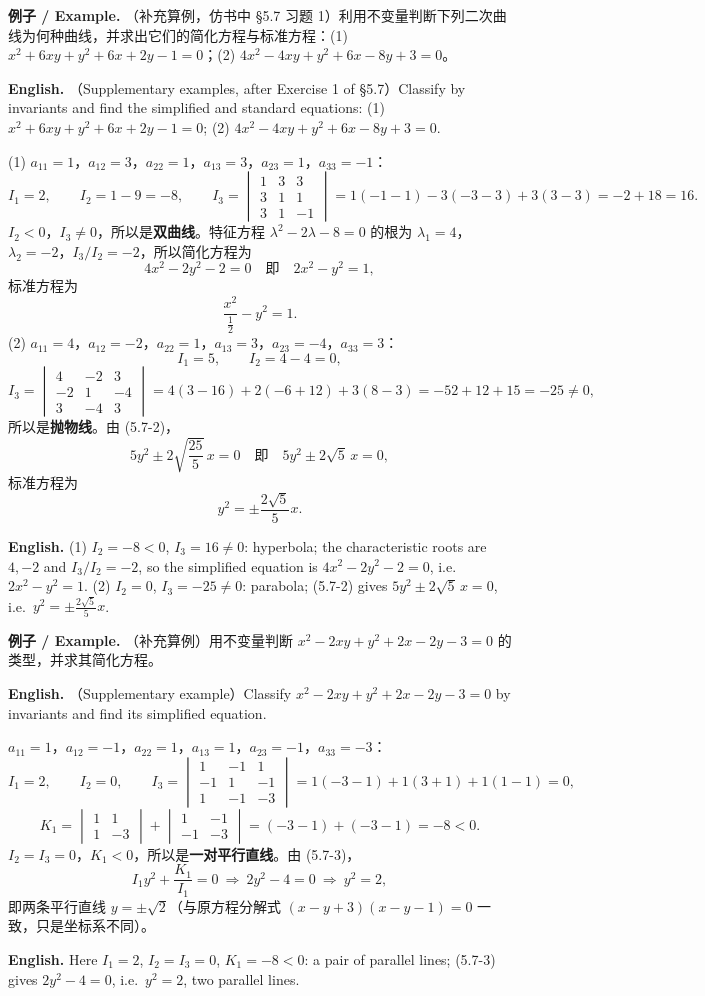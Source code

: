 \documentclass[UTF8,11pt,a4paper]{ctexart}
\newcommand{\EN}[1]{\par\noindent \textbf{English.} #1\par}
\newcommand{\EX}[2]{\par\noindent \textbf{例子 / Example.} #1\par\EN{#2}}
\theoremstyle{definition}
\begin{document}
\EX{（补充算例，仿书中 §5.7 习题 1）利用不变量判断下列二次曲线为何种曲线，并求出它们的简化方程与标准方程：(1) $x^2+6xy+y^2+6x+2y-1=0$；(2) $4x^2-4xy+y^2+6x-8y+3=0$。}{（Supplementary examples, after Exercise 1 of §5.7）Classify by invariants and find the simplified and standard equations: (1) $x^2+6xy+y^2+6x+2y-1=0$; (2) $4x^2-4xy+y^2+6x-8y+3=0$.}
(1) $a_{11}=1$，$a_{12}=3$，$a_{22}=1$，$a_{13}=3$，$a_{23}=1$，$a_{33}=-1$：
\[
I_1=2,\qquad I_2=1-9=-8,\qquad
I_3=\begin{vmatrix}1&3&3\\ 3&1&1\\ 3&1&-1\end{vmatrix}=1(-1-1)-3(-3-3)+3(3-3)=-2+18=16.
\]
$I_2<0$，$I_3\ne0$，所以是\textbf{双曲线}。特征方程 $\lambda^2-2\lambda-8=0$ 的根为 $\lambda_1=4$，$\lambda_2=-2$，$I_3/I_2=-2$，所以简化方程为
\[
4x^2-2y^2-2=0\quad\text{即}\quad 2x^2-y^2=1,
\]
标准方程为
\[
\frac{x^2}{\frac12}-y^2=1.
\]
(2) $a_{11}=4$，$a_{12}=-2$，$a_{22}=1$，$a_{13}=3$，$a_{23}=-4$，$a_{33}=3$：
\[
I_1=5,\qquad I_2=4-4=0,
\]
\[
I_3=\begin{vmatrix}4&-2&3\\ -2&1&-4\\ 3&-4&3\end{vmatrix}=4(3-16)+2(-6+12)+3(8-3)=-52+12+15=-25\ne0,
\]
所以是\textbf{抛物线}。由 (5.7-2)，
\[
5y^2\pm2\sqrt{\frac{25}{5}}\,x=0\quad\text{即}\quad 5y^2\pm2\sqrt5\,x=0,
\]
标准方程为
\[
y^2=\pm\frac{2\sqrt5}{5}x.
\]
\EN{(1) $I_2=-8<0$, $I_3=16\ne0$: hyperbola; the characteristic roots are $4,-2$ and $I_3/I_2=-2$, so the simplified equation is $4x^2-2y^2-2=0$, i.e.\ $2x^2-y^2=1$. (2) $I_2=0$, $I_3=-25\ne0$: parabola; (5.7-2) gives $5y^2\pm2\sqrt5\,x=0$, i.e.\ $y^2=\pm\frac{2\sqrt5}{5}x$.}

\EX{（补充算例）用不变量判断 $x^2-2xy+y^2+2x-2y-3=0$ 的类型，并求其简化方程。}{（Supplementary example）Classify $x^2-2xy+y^2+2x-2y-3=0$ by invariants and find its simplified equation.}
$a_{11}=1$，$a_{12}=-1$，$a_{22}=1$，$a_{13}=1$，$a_{23}=-1$，$a_{33}=-3$：
\[
I_1=2,\qquad I_2=0,\qquad
I_3=\begin{vmatrix}1&-1&1\\ -1&1&-1\\ 1&-1&-3\end{vmatrix}=1(-3-1)+1(3+1)+1(1-1)=0,
\]
\[
K_1=\begin{vmatrix}1&1\\ 1&-3\end{vmatrix}+\begin{vmatrix}1&-1\\ -1&-3\end{vmatrix}=(-3-1)+(-3-1)=-8<0.
\]
$I_2=I_3=0$，$K_1<0$，所以是\textbf{一对平行直线}。由 (5.7-3)，
\[
I_1y^2+\frac{K_1}{I_1}=0\ \Longrightarrow\ 2y^2-4=0\ \Longrightarrow\ y^2=2,
\]
即两条平行直线 $y=\pm\sqrt2$（与原方程分解式 $(x-y+3)(x-y-1)=0$ 一致，只是坐标系不同）。
\EN{Here $I_1=2$, $I_2=I_3=0$, $K_1=-8<0$: a pair of parallel lines; (5.7-3) gives $2y^2-4=0$, i.e.\ $y^2=2$, two parallel lines.}
\end{document}
